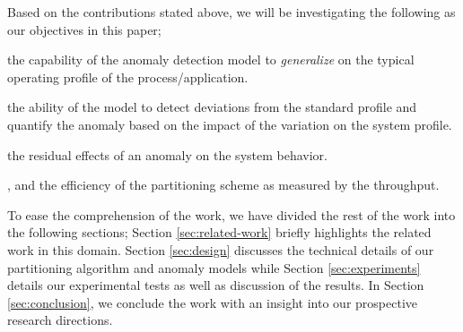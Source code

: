 Based on the contributions stated above, we will be investigating the following 
as our objectives in this paper;
\begin{enumerate*}[label={\alph*)},font={\bfseries}]
    \item the capability of the anomaly detection model to \emph{generalize} on 
    the typical operating profile of the process/application.
\item the ability of the model to detect deviations from the standard profile 
and quantify the anomaly based on the impact of the variation on the system 
profile.
\item the residual effects of an anomaly on the system behavior.
\item, and the efficiency of the partitioning scheme as measured by the 
throughput.
\end{enumerate*}
To ease the comprehension of the work, we have divided the rest of the work 
into the following sections; Section \ref{sec:related-work} briefly highlights 
the related work in this domain. Section \ref{sec:design} discusses the 
technical details of our partitioning algorithm and anomaly models while 
Section \ref{sec:experiments} details our experimental 
tests as well as discussion of the results. In Section \ref{sec:conclusion}, we 
conclude the work with an insight into our prospective research directions.

